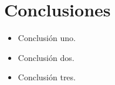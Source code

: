 \section{Conclusiones}
\begin{itemize}
	\item Conclusión uno.
	\item Conclusión dos.
	\item Conclusión tres.
\end{itemize}

